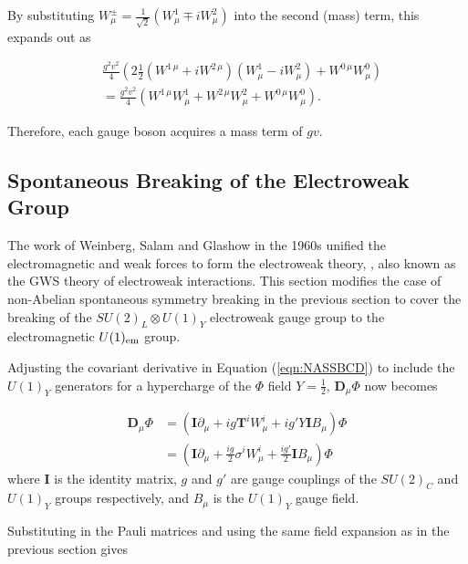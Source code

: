 \documentclass{article}
\begin{document}
By substituting $W^{\pm}_\mu = \frac{1}{\sqrt{2}}(W^{1}_\mu \mp iW^{2}_\mu)$ into the second (mass) term, this expands out as

\begin{equation}
\begin{split}
& \frac{g^2v^2}{4}\left( 2\frac{1}{2}(W^{1\,\mu}+iW^{2\,\mu})(W^{1}_\mu - iW^{2}_\mu) + W^{0\,\mu}W^{0}_\mu\right) \\ 
& = \frac{g^2v^2}{4}(W^{1\,\mu}W^{1}_\mu + W^{2\,\mu}W^{2}_\mu + W^{0\,\mu}W^{0}_\mu).
\end{split}
\end{equation}

Therefore, each gauge boson acquires a mass term of $gv$.

\subsection{Spontaneous Breaking of the Electroweak Group}%
\label{sec:SM_EWU}
The work of Weinberg, Salam and Glashow in the 1960s unified the electromagnetic and weak forces to form the electroweak theory\cite{EWUWeinberg}, \cite{EWUGlashow}, also known as the GWS theory of electroweak interactions. This section modifies the case of non-Abelian spontaneous symmetry breaking in the previous section to cover the breaking of the $SU(2)_L \otimes U(1)_Y$ electroweak gauge group to the electromagnetic $U(1)_{\rm{em}}$ group.

Adjusting the covariant derivative in Equation (\ref{eqn:NASSBCD}) to include the $U(1)_Y$ generators for a hypercharge of the $\Phi$ field $Y=\frac{1}{2}$, $\bm{D}_\mu\Phi$ now becomes

\begin{equation}
\begin{split}
\bm{D}_\mu \Phi & = \left( \bm{I} \partial_\mu + ig\bm{T}^iW^{i}_\mu + ig'Y\bm{I}B_\mu  \right)\Phi\\
& = \left( \bm{I} \partial_\mu + \frac{ig}{2}\sigma^iW^{i}_\mu + \frac{ig'}{2}\bm{I}B_\mu  \right)\Phi
\end{split}
\end{equation}
where $\bm{I}$ is the identity matrix, $g$ and $g'$ are gauge couplings of the $SU(2)_C$ and $U(1)_Y$ groups respectively, and $B_\mu$ is the $U(1)_Y$ gauge field.

Substituting in the Pauli matrices and using the same field expansion as in the previous section gives 
\end{document}
